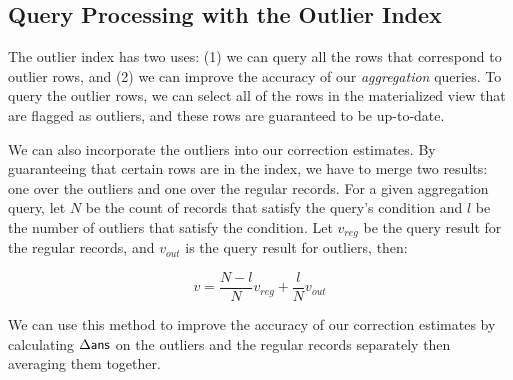 \subsection{Query Processing with the Outlier Index} 
The outlier index has two uses: (1) we can query all the rows that correspond to outlier rows, 
and (2) we can improve the accuracy of our \emph{aggregation} queries.
To query the outlier rows, we can select all of the rows in the materialized view that are flagged as outliers, and these rows are guaranteed to be up-to-date.

We can also incorporate the outliers into our correction estimates.  
By guaranteeing that certain rows are in the index, we
have to merge two results: one over the outliers and one over the regular records.
For a given aggregation query, let $N$ be the count of records that satisfy the query's condition and $l$ be the number of outliers that satisfy the condition.
Let $v_{reg}$ be the query result for the regular records, and $v_{out}$ is the query result for outliers, then:

\[
 v = \frac{N-l}{N}v_{reg} + \frac{l}{N}v_{out}
\]

We can use this method to improve the accuracy of our correction estimates by calculating $\Delta\textsf{ans}$ 
on the outliers and the regular records separately then averaging them together. 
